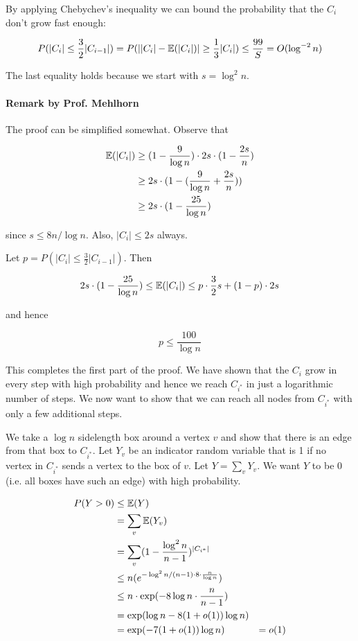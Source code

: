 By applying Chebychev's inequality we can bound the probability that the $C_i$ don't grow fast enough:

\[P(|C_i| \leq \frac 32 |C_{i-1}|) = P(||C_i| - \mathbb{E}(|C_i|) | \geq \frac 13 |C_i|) \leq \frac{99}{S} = O(\log ^{-2} n)\]

The last equality holds because we start with $s=\log ^2n$. 

\paragraph{Remark by Prof. Mehlhorn} The proof can be simplified somewhat. Observe that

\begin{align*}
\mathbb{E}(|C_i|) & \geq ( 1-\frac{9}{\log n}) \cdot 2s \cdot (1-\frac{2s}{n})\\
	&\geq 2s\cdot (1-(\frac{9}{\log n} + \frac{2s}{n}))\\
	&\geq 2s\cdot (1-\frac{25}{\log n})
\end{align*}	

since $s\leq 8n/ \log n$. Also, $|C_i| \leq 2s$ always.

Let $p= P(|C_i| \leq \frac 32 |C_{i-1}|)$. Then

\[2s\cdot (1-\frac{25}{\log n}) \leq \mathbb{E}(|C_i|) \leq p \cdot \frac 32 s + (1-p)\cdot 2s\]

and hence

\[p\leq \frac{100}{\log n}\]

This completes the first part of the proof. We have shown that the $C_i$ grow in every step with high probability and hence we reach $C_{i^*}$ in just a logarithmic number of steps. We now want to show that we can reach all nodes from $C_{i^*}$ with only a few additional steps.

We take a $\log n$ sidelength box around a vertex $v$ and show that there is an edge from that box to $C_{i^*}$. Let $Y_v$ be an indicator random variable that is 1 if no vertex in $C_{i^*}$ sends a vertex to the box of $v$. Let $Y=\sum_v Y_v$. We want $Y$ to be $0$ (i.e. all boxes have such an edge) with high probability.

\begin{align*}
P(Y>0) &\leq \mathbb{E}(Y) \\
	&= \sum_v \mathbb{E}(Y_v)\\
	&= \sum_v (1-\frac{\log^2n}{n-1})^{|C_{i^*}|}\\
	&\leq n (e^{-\log^2n/(n-1)\cdot 8\cdot \frac{n}{\log n}})\\
	&\leq n \cdot \exp(-8\log n \cdot \frac{n}{n-1})\\
	&=\exp (\log n - 8(1+o(1))\log n)\\
	&=\exp (-7(1+o(1)) \log n)
	&=o(1)
\end{align*}

